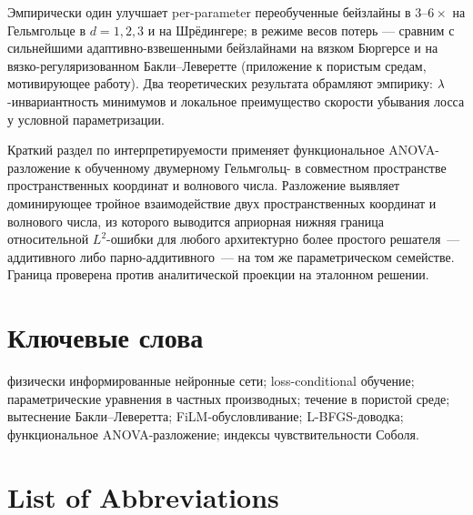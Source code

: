 \documentclass[12pt,a4paper]{extarticle}
\begin{document}
Эмпирически один \LCPINN{} улучшает per-parameter переобученные бейзлайны в $3$--$6\times$ на Гельмгольце в $d = 1, 2, 3$ и на Шрёдингере; в режиме весов потерь --- сравним с сильнейшими адаптивно-взвешенными бейзлайнами на вязком Бюргерсе и на вязко-регуляризованном Бакли--Леверетте (приложение к пористым средам, мотивирующее работу). Два теоретических результата обрамляют эмпирику: $\lambda$-инвариантность минимумов и локальное преимущество скорости убывания лосса у условной параметризации.

Краткий раздел по интерпретируемости применяет функциональное ANOVA-разложение к обученному двумерному Гельмгольц-\LCPINN{} в совместном пространстве пространственных координат и волнового числа. Разложение выявляет доминирующее тройное взаимодействие двух пространственных координат и волнового числа, из которого выводится априорная нижняя граница относительной $L^2$-ошибки для любого архитектурно более простого решателя~--- аддитивного либо парно-аддитивного~--- на том же параметрическом семействе. Граница проверена против аналитической проекции на эталонном решении.

\section*{Ключевые слова}

физически информированные нейронные сети; loss-conditional обучение; параметрические уравнения в частных производных; течение в пористой среде; вытеснение Бакли--Леверетта; FiLM-обусловливание; L-BFGS-доводка; функциональное ANOVA-разложение; индексы чувствительности Соболя.


\newpage

\section*{List of Abbreviations}
\end{document}
